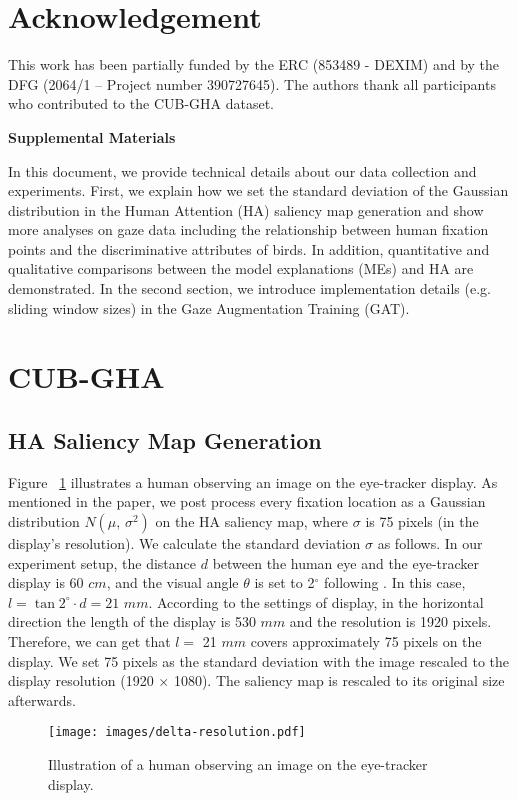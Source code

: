 \documentclass{bmvc2k}
\begin{document}
\section{Acknowledgement}
This work has been partially funded by the ERC (853489 - DEXIM) and by the DFG (2064/1 – Project number 390727645). The authors thank all participants who contributed to the CUB-GHA dataset.





\pagebreak
\begin{center}
\textbf{\large Supplemental Materials}
\end{center}
\setcounter{equation}{0}
\setcounter{figure}{0}
\setcounter{table}{0}
\setcounter{section}{0}
\makeatletter
\renewcommand{\theequation}{S\arabic{equation}}
\renewcommand{\thefigure}{S\arabic{figure}}
\renewcommand{\thetable}{S\arabic{table}}
\renewcommand{\bibnumfmt}[1]{[S#1]}
In this document, we provide technical details about our data collection and experiments. First, we explain how we set the standard deviation of the Gaussian distribution in the Human Attention (HA) saliency map generation and show more analyses on gaze data including the relationship between human fixation points and the discriminative attributes of birds. In addition, quantitative and qualitative comparisons between the model explanations (MEs) and HA are demonstrated. In the second section, we introduce implementation details (e.g. sliding window sizes) in the Gaze Augmentation Training (GAT). 

\section{CUB-GHA}
\subsection{HA Saliency Map Generation}
Figure \ \ref{fig:gaussian} illustrates a human observing an image on the eye-tracker display. As mentioned in the paper, we post process every fixation location as a Gaussian distribution ${N}(\mu,\,\sigma^{2})$ on the HA saliency map, where $\sigma$ is 75 pixels (in the display's resolution). We calculate the standard deviation $\sigma$ as follows. 
In our experiment setup, the distance $d$ between the human eye and the eye-tracker display is 60 $cm$, and the visual angle $\theta$ is set to 2$^{\circ}$ following \cite{vickers2007perception}. In this case, $l=\tan{2^{\circ}} \cdot d = 21$ $mm$. According to the settings of display, in the horizontal direction the length of the display is 530 $mm$ and the resolution is 1920 pixels. Therefore, we can get that $l=$ 21 $mm$ covers approximately 75 pixels on the display. We set 75 pixels as the standard deviation with the image rescaled to the display resolution (1920 $\times$ 1080). The saliency map is rescaled to its original size afterwards.
\begin{figure}[h]
    \centering
    \texttt{[image: images/delta-resolution.pdf]} 
    \vspace{0.1cm}
    \caption{Illustration of a human observing an image on the eye-tracker display.}
    \label{fig:gaussian}
\end{figure}
\end{document}
